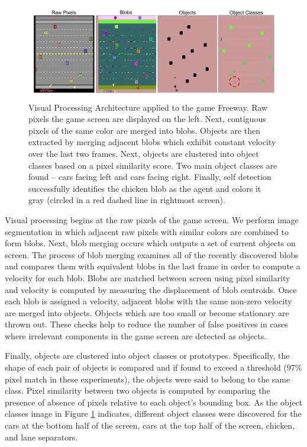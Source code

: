 \documentclass{acm_proc_article-sp}
\begin{document}
\begin{figure}[htp]
\begin{center}
\includegraphics[width=\textwidth]{figures/AtariArch}
\end{center}
\caption{Visual Processing Architecture applied to the game Freeway. Raw pixels the game screen are displayed on the left. Next, contiguous pixels of the same color are merged into blobs. Objects are then extracted by merging adjacent blobs which exhibit constant velocity over the last two frames. Next, objects are clustered into object classes based on a pixel similarity score. Two main object classes are found -- cars facing left and cars facing right. Finally, self detection successfully identifies the chicken blob as the agent and colors it gray (circled in a red dashed line in rightmost screen).}
\label{fig:visproc}
\end{figure}

Visual processing begins at the raw pixels of the game screen. We perform image segmentation in which adjacent raw pixels with similar colors are combined to form blobs. Next, blob merging occurs which outputs a set of current objects on screen. The process of blob merging examines all of the recently discovered blobs and compares them with equivalent blobs in the last frame in order to compute a velocity for each blob. Blobs are matched between screen using pixel similarity and velocity is computed by measuring the displacement of blob centroids. Once each blob is assigned a velocity, adjacent blobs with the same non-zero velocity are merged into objects.  Objects which are too small or become stationary are thrown out. These checks help to reduce the number of false positives in cases where irrelevant components in the game screen are detected as objects.

Finally, objects are clustered into object classes or prototypes. Specifically, the shape of each pair of objects is compared and if found to exceed a threshold (97\% pixel match in these experiments), the objects were said to belong to the same class. Pixel similarity between two objects is computed by comparing the presence of absence  of pixels relative to each object's bounding box. As the object classes image in Figure \ref{fig:visproc} indicates, different object classes were discovered for the cars at the bottom half of the screen, cars at the top half of the screen, chicken, and lane separators. 
\end{document}

